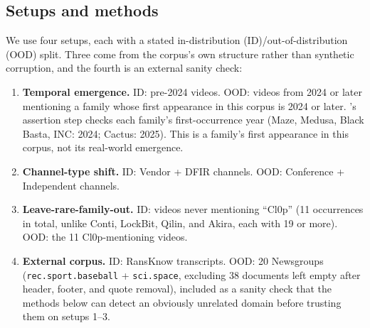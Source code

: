 \documentclass[preprint,12pt]{elsarticle}
\begin{document}
\subsection{Setups and methods}
\label{sec:ood-setups}
We use four setups, each with a stated in-distribution
(ID)/out-of-distribution (OOD) split. Three come from the corpus's own
structure rather than synthetic corruption, and the fourth is an external
sanity check:

\begin{enumerate}
\item \textbf{Temporal emergence.} ID: pre-2024 videos. OOD: videos from
  2024 or later mentioning a family whose first appearance in this corpus
  is 2024 or later. 's assertion step checks each
  family's first-occurrence year (Maze, Medusa, Black Basta, INC: 2024;
  Cactus: 2025). This is a family's first appearance in this corpus, not its
  real-world emergence.
\item \textbf{Channel-type shift.} ID: Vendor + DFIR channels. OOD:
  Conference + Independent channels.
\item \textbf{Leave-rare-family-out.} ID: videos never mentioning
  ``Cl0p'' (11 occurrences in total, unlike Conti, LockBit, Qilin, and Akira,
  each with 19 or more). OOD: the 11 Cl0p-mentioning videos.
\item \textbf{External corpus.} ID: RansKnow transcripts. OOD: 20
  Newsgroups \citep{lang1995newsweeder} (\texttt{rec.\allowbreak sport.\allowbreak baseball} + \texttt{sci.\allowbreak space},
  excluding 38 documents left empty after header, footer, and quote
  removal), included as a sanity check that the methods below can detect
  an obviously unrelated domain before trusting them on setups 1--3.
\end{enumerate}
\end{document}
